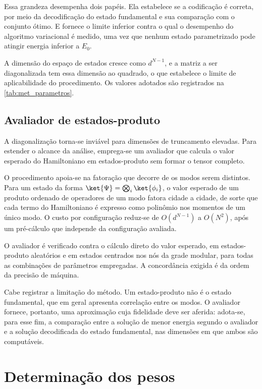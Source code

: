         Essa grandeza desempenha dois papéis. Ela estabelece se a codificação é correta, por meio da decodificação do estado fundamental e sua comparação com o conjunto ótimo. E fornece o limite inferior contra o qual o desempenho do algoritmo variacional é medido, uma vez que nenhum estado parametrizado pode atingir energia inferior a $E_0$.

        A dimensão do espaço de estados cresce como $d^{N-1}$, e a matriz a ser diagonalizada tem essa dimensão ao quadrado, o que estabelece o limite de aplicabilidade do procedimento. Os valores adotados são registrados na \autoref{tab:met_parametros}.

    \subsection{Avaliador de estados-produto}\label{subsec:met_fatorado}

        A diagonalização torna-se inviável para dimensões de truncamento elevadas. Para estender o alcance da análise, emprega-se um avaliador que calcula o valor esperado do Hamiltoniano em estados-produto sem formar o tensor completo.

        O procedimento apoia-se na fatoração que decorre de os modos serem distintos. Para um estado da forma $\ket{\Psi} = \bigotimes_i \ket{\phi_i}$, o valor esperado de um produto ordenado de operadores de um modo fatora cidade a cidade, de sorte que cada termo do Hamiltoniano é expresso como polinômio nos momentos de um único modo. O custo por configuração reduz-se de $O(d^{N-1})$ a $O(N^2)$, após um pré-cálculo que independe da configuração avaliada.

        O avaliador é verificado contra o cálculo direto do valor esperado, em estados-produto aleatórios e em estados centrados nos nós da grade modular, para todas as combinações de parâmetros empregadas. A concordância exigida é da ordem da precisão de máquina.

        Cabe registrar a limitação do método. Um estado-produto não é o estado fundamental, que em geral apresenta correlação entre os modos. O avaliador fornece, portanto, uma aproximação cuja fidelidade deve ser aferida: adota-se, para esse fim, a comparação entre a solução de menor energia segundo o avaliador e a solução decodificada do estado fundamental, nas dimensões em que ambos são computáveis.

\section{Determinação dos pesos}\label{sec:met_pesos}

